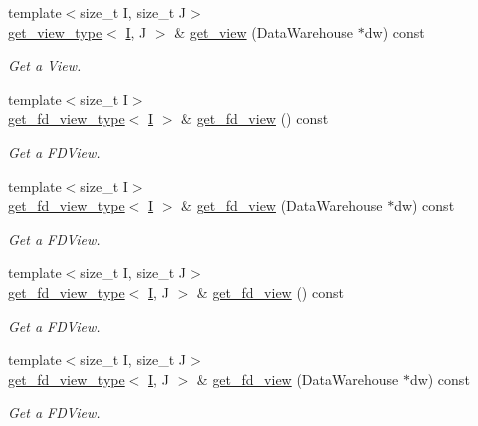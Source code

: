 \begin{DoxyCompactItemize}
{\footnotesize template$<$size\+\_\+t I, size\+\_\+t J$>$ }\\\hyperlink{classUintah_1_1PhaseField_1_1Problem_a53d941e785f501dddb8c369644eae4fa}{get\+\_\+view\+\_\+type}$<$ \hyperlink{structUintah_1_1PhaseField_1_1I}{I}, J $>$ \& \hyperlink{classUintah_1_1PhaseField_1_1Problem_aeff947e34ce8b615a988f77af9eac55c}{get\+\_\+view} (Data\+Warehouse $\ast$dw) const
\begin{DoxyCompactList}\small\item\em Get a View. \end{DoxyCompactList}\item 
{\footnotesize template$<$size\+\_\+t I$>$ }\\\hyperlink{classUintah_1_1PhaseField_1_1Problem_a89c10e32620acbe3cae959667a1cdd3e}{get\+\_\+fd\+\_\+view\+\_\+type}$<$ \hyperlink{structUintah_1_1PhaseField_1_1I}{I} $>$ \& \hyperlink{classUintah_1_1PhaseField_1_1Problem_a6e1beb1a9b10e0019116af1eb3aeea8b}{get\+\_\+fd\+\_\+view} () const
\begin{DoxyCompactList}\small\item\em Get a F\+D\+View. \end{DoxyCompactList}\item 
{\footnotesize template$<$size\+\_\+t I$>$ }\\\hyperlink{classUintah_1_1PhaseField_1_1Problem_a89c10e32620acbe3cae959667a1cdd3e}{get\+\_\+fd\+\_\+view\+\_\+type}$<$ \hyperlink{structUintah_1_1PhaseField_1_1I}{I} $>$ \& \hyperlink{classUintah_1_1PhaseField_1_1Problem_a619b0a0b56f6ef1f6d4e6d601c9a3521}{get\+\_\+fd\+\_\+view} (Data\+Warehouse $\ast$dw) const
\begin{DoxyCompactList}\small\item\em Get a F\+D\+View. \end{DoxyCompactList}\item 
{\footnotesize template$<$size\+\_\+t I, size\+\_\+t J$>$ }\\\hyperlink{classUintah_1_1PhaseField_1_1Problem_a89c10e32620acbe3cae959667a1cdd3e}{get\+\_\+fd\+\_\+view\+\_\+type}$<$ \hyperlink{structUintah_1_1PhaseField_1_1I}{I}, J $>$ \& \hyperlink{classUintah_1_1PhaseField_1_1Problem_adb7a0bc3da6d502b45e8addb33772699}{get\+\_\+fd\+\_\+view} () const
\begin{DoxyCompactList}\small\item\em Get a F\+D\+View. \end{DoxyCompactList}\item 
{\footnotesize template$<$size\+\_\+t I, size\+\_\+t J$>$ }\\\hyperlink{classUintah_1_1PhaseField_1_1Problem_a89c10e32620acbe3cae959667a1cdd3e}{get\+\_\+fd\+\_\+view\+\_\+type}$<$ \hyperlink{structUintah_1_1PhaseField_1_1I}{I}, J $>$ \& \hyperlink{classUintah_1_1PhaseField_1_1Problem_a43e532eaf9aff9d7cfdec7190ab2b0f8}{get\+\_\+fd\+\_\+view} (Data\+Warehouse $\ast$dw) const
\begin{DoxyCompactList}\small\item\em Get a F\+D\+View. \end{DoxyCompactList}\end{DoxyCompactItemize}
